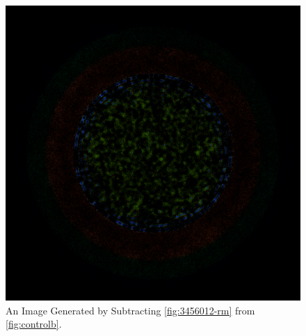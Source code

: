 \begin{figure}[H]
\centering
\includegraphics[width=0.6\linewidth]{figures/shuffle/diff-3456012}
\caption{An Image Generated by Subtracting \ref{fig:3456012-rm} from \ref{fig:controlb}.}
\label{fig:diff-3456012}
\end{figure}